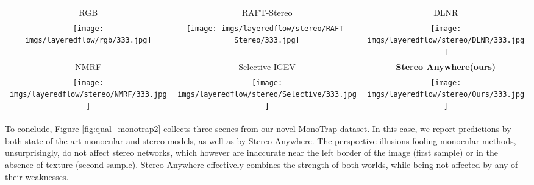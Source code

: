 \documentclass[10pt,twocolumn,letterpaper]{article}
\newcommand{\method}[0]{Stereo Anywhere\xspace}
\newcommand{\dataset}[0]{MonoTrap\xspace}
\begin{document}
\begin{figure*}[h]
\begin{tabular}{ccc}
        \small RGB &
        \small RAFT-Stereo \cite{lipson2021raft} &
        \small DLNR \cite{zhao2023high} \\
        \texttt{[image: imgs/layeredflow/rgb/333.jpg]} &
        \texttt{[image: imgs/layeredflow/stereo/RAFT-Stereo/333.jpg]} &
        \texttt{[image: imgs/layeredflow/stereo/DLNR/333.jpg]} \\
        \small NMRF \cite{guan2024neural} &
        \small Selective-IGEV \cite{wang2024selective} &
        \textbf{\method (ours)} \\
        \texttt{[image: imgs/layeredflow/stereo/NMRF/333.jpg]} &
        \texttt{[image: imgs/layeredflow/stereo/Selective/333.jpg]} &
        \texttt{[image: imgs/layeredflow/stereo/Ours/333.jpg]} \\
    \end{tabular}

    \caption{\textbf{Qualitative Results -- LayeredFlow.} Predictions by state-of-the-art models and \method.}
    \label{fig:qual_layered}\vspace{-0.3cm}

\end{figure*}

\clearpage

To conclude, Figure \ref{fig:qual_monotrap2} collects three scenes from our novel \dataset dataset. In this case, we report predictions by both state-of-the-art monocular and stereo models, as well as by \method.
The perspective illusions fooling monocular methods, unsurprisingly, do not affect stereo networks, which however are inaccurate near the left border of the image (first sample) or in the absence of texture (second sample).
\method effectively combines the strength of both worlds, while being not affected by any of their weaknesses.
\end{document}
